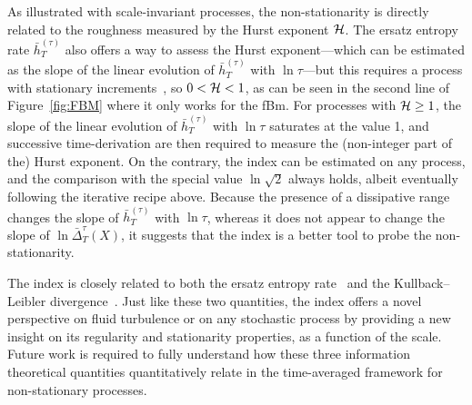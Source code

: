 \documentclass[aps,pra,groupedaddress,notitlepage]{revtex4-1}
\begin{document}
As illustrated with scale-invariant processes, the non-stationarity is directly related to the roughness measured by the Hurst exponent ${\cal H}$. The ersatz entropy rate $\bar{h}^{(\tau)}_T$ also offers a way to assess the Hurst exponent---which can be estimated as the slope of the linear evolution of $\bar{h}^{(\tau)}_T$ with $\ln\tau$---but this requires a process with stationary increments~\cite{GraneroBelinchon2019}, so $0<{\cal H}<1$, as can be seen in the second line of Figure~\ref{fig:FBM} where it only works for the fBm. For processes with ${\cal H}\ge 1$, the slope of the linear evolution of $\bar{h}^{(\tau)}_T$ with $\ln\tau$ saturates at the value 1, and successive time-derivation are then required to measure the (non-integer part of the) Hurst exponent. On the contrary, the index can be estimated on any process, and the comparison with the special value $\ln\sqrt{2}$ always holds, albeit eventually following the iterative recipe above. Because the presence of a dissipative range changes the slope of $\bar{h}^{(\tau)}_T$ with $\ln\tau$, whereas it does not appear to change the slope of $\ln \bar{\Delta}_T^{\tau}(X)$, it suggests that the index is a better tool to probe the non-stationarity.

The index is closely related to both the ersatz entropy rate~\cite{GraneroBelinchon2019} and the Kullback--Leibler divergence~\cite{GraneroBelinchon2018}. Just like these two quantities, the index offers a novel perspective on fluid turbulence or on any stochastic process by providing a new insight on its regularity and stationarity properties, as a function of the scale.
Future work is required to fully understand how these three information theoretical quantities quantitatively relate in the time-averaged framework for non-stationary processes. 




\end{document}
